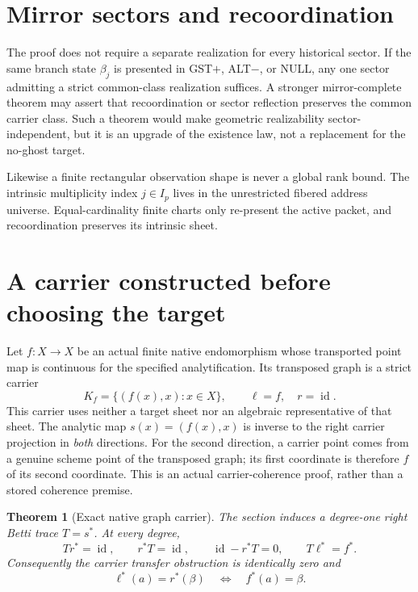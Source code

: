 \documentclass[11pt]{article}
\newtheorem{theorem}[definition]{Theorem}
\begin{document}
\section{Mirror sectors and recoordination}

The proof does not require a separate realization for every historical sector.
If the same branch state $\beta_j$ is presented in GST$+$, ALT$-$, or NULL,
any one sector admitting a strict common-class realization suffices.  A stronger
mirror-complete theorem may assert that recoordination or sector reflection
preserves the common carrier class.  Such a theorem would make geometric
realizability sector-independent, but it is an upgrade of the existence law,
not a replacement for the no-ghost target.

Likewise a finite rectangular observation shape is never a global rank bound.
The intrinsic multiplicity index $j\in I_p$ lives in the unrestricted fibered
address universe.  Equal-cardinality finite charts only re-present the active
packet, and recoordination preserves its intrinsic sheet.

\section{A carrier constructed before choosing the target}

Let $f:X\to X$ be an actual finite native endomorphism whose transported
point map is continuous for the specified analytification.  Its transposed
graph is a strict carrier
\[
  K_f=\{(f(x),x):x\in X\},\qquad \ell=f,\quad r=\operatorname{id}.
\]
This carrier uses neither a target sheet nor an algebraic representative of
that sheet.  The analytic map $s(x)=(f(x),x)$ is inverse to the right carrier
projection in \emph{both} directions.  For the second direction, a carrier
point comes from a genuine scheme point of the transposed graph; its first
coordinate is therefore $f$ of its second coordinate.  This is an actual
carrier-coherence proof, rather than a stored coherence premise.

\begin{theorem}[Exact native graph carrier]
The section induces a degree-one right Betti trace $T=s^*$.  At every degree,
\[
  T r^*=\operatorname{id},\qquad r^*T=\operatorname{id},
  \qquad \operatorname{id}-r^*T=0,
  \qquad T\ell^*=f^*.
\]
Consequently the carrier transfer obstruction is identically zero and
\[
  \ell^*(a)=r^*(\beta)\quad\Longleftrightarrow\quad f^*(a)=\beta.
\]
\end{theorem}
\end{document}
